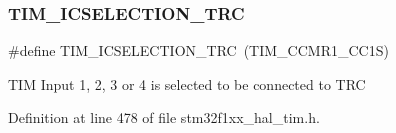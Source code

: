 \subsubsection{\texorpdfstring{T\+I\+M\+\_\+\+I\+C\+S\+E\+L\+E\+C\+T\+I\+O\+N\+\_\+\+T\+RC}{TIM\_ICSELECTION\_TRC}}
{\footnotesize\ttfamily \#define T\+I\+M\+\_\+\+I\+C\+S\+E\+L\+E\+C\+T\+I\+O\+N\+\_\+\+T\+RC~(T\+I\+M\+\_\+\+C\+C\+M\+R1\+\_\+\+C\+C1S)}

T\+IM Input 1, 2, 3 or 4 is selected to be connected to T\+RC 

Definition at line 478 of file stm32f1xx\+\_\+hal\+\_\+tim.\+h.

